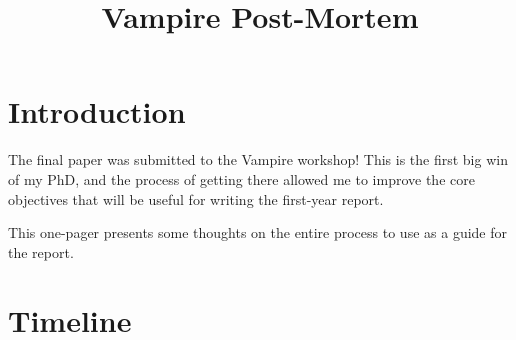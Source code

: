 \documentclass[twocolumn,10pt,a4paper]{article}
\title{Vampire Post-Mortem}
\date{}
\author{}
\begin{document}
\twocolumn[
	\centering
	\vspace{1em}
	{\LARGE\bfseries Vampire Paper Post-Mortem \par} \vspace{3pt}
	{\large (and next steps on my PhD) \par}
	\vspace{2em}
]

\section{Introduction}

The final paper was submitted to the Vampire workshop!
This is the first big win of my PhD, and the process of getting there allowed me to improve the core objectives that will be useful for writing the first-year report.

This one-pager presents some thoughts on the entire process to use as a guide for the report.


\section{Timeline}

\end{document}
